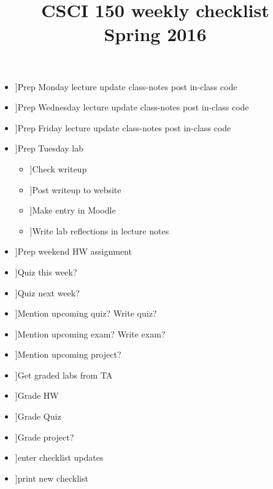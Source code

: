 \documentclass{article}
\title{CSCI 150 weekly checklist \\ {\small Spring 2016}}
\date{}
\newcommand{\cbox}{\framebox[1em]{\phantom{x}}}
\newcommand{\ci}{\item[\cbox]}
\newcommand{\also}{\cbox \hspace{1ex}}
\begin{document}
\maketitle
\thispagestyle{empty}

\begin{itemize}
\ci Prep Monday lecture \also update class-notes \also post in-class code
\ci Prep Wednesday lecture \also update class-notes \also post in-class code
\ci Prep Friday lecture \also update class-notes \also post in-class code \\

\ci Prep Tuesday lab
\begin{itemize}
\ci Check writeup
\ci Post writeup to website
\ci Make entry in Moodle
\ci Write lab reflections in lecture notes
\end{itemize}
\ci Prep weekend HW assignment \\

\ci Quiz this week?
\ci Quiz next week?
\ci Mention upcoming quiz? \also Write quiz?
\ci Mention upcoming exam? \also Write exam?
\ci Mention upcoming project? \\

\ci Get graded labs from TA
\ci Grade HW
\ci Grade Quiz
\ci Grade project? \\

\ci enter checklist updates
\ci print new checklist
\end{itemize}
\end{document}
